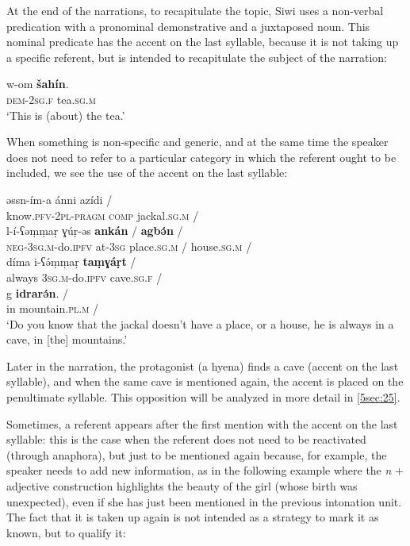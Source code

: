 \documentclass[output=paper]{langsci/langscibook}
\begin{document}
At the end of the narrations, to recapitulate the topic, Siwi uses a non-verbal predication with a pronominal demonstrative and a juxtaposed noun. This nominal predicate has the accent on the last syllable, because it is not taking up a specific referent, but is intended to recapitulate the subject of the narration:

\begin{exe}
\ex\label{5ex:10}
\gll	w-om			{\textbf{šahín}}. \\
	{\textsc{dem-2sg.f}}	tea.{\textsc{sg.m}} \\
\glt	`This is (about) the tea.'
\end{exe}

When something is non-specific and generic, and at the same time the speaker does not need to refer to a particular category in which the referent ought to be included, we see the use of the accent on the last syllable:

\begin{exe}
\ex\label{5ex:11}
\gll	əssn-ím-a	ánni	azídi	/ \\
	know.{\textsc{pfv-2pl-pragm}}	{\textsc{comp}}	jackal.{\textsc{sg.m}}	/ \\
\glt
\exi{}
\gll	l-í-ʕəṃṃaṛ	ɣúṛ-əs	{\textbf{ankán}}	/	{\textbf{agbə́n}}	/ \\
	{\textsc{neg-3sg.m}}-do.{\textsc{ipfv}}	at-{\textsc{3sg}}	place.{\textsc{sg.m}}	/	house.{\textsc{sg.m}}	/ \\
\glt
\exi{}
\gll	díma	i-ʕə́ṃṃaṛ	{\textbf{taṃɣáṛt}}	/ \\
	always	{\textsc{3sg.m}}-do.{\textsc{ipfv}}	cave.{\textsc{sg.f}}	/ \\
\glt
\exi{}
\gll	g	{\textbf{idrarə́n}}.	/ \\
	in	mountain.{\textsc{pl.m}}	/ \\
\glt	`Do you know that the jackal doesn't have a place, or a house, he is always in a cave, in [the] mountains.'
\end{exe}

{
Later in the narration, the protagonist (a hyena) finds a cave (accent on the last syllable), and when the same cave is mentioned again, the accent is placed on the penultimate syllable. This opposition will be analyzed in more detail in \ref{5sec:25}.
}

Sometimes, a referent appears after the first mention with the accent on the last syllable: this is the case when the referent does not need to be reactivated (through anaphora), but just to be mentioned again because, for example, the speaker needs to add new information, as in the following example where the {\emph{n}} + adjective construction highlights the beauty of the girl (whose birth was unexpected), even if she has just been mentioned in the previous intonation unit. The fact that it is taken up again is not intended as a strategy to mark it as known, but to qualify it:
\end{document}

